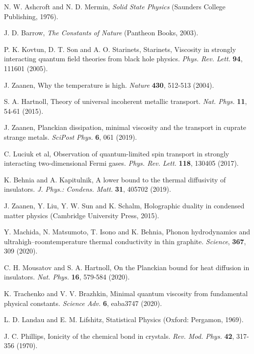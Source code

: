 \documentclass[aps,prl,groupedaddress,fleqn,twocolumn,10pt]{revtex4}
\begin{document}
\begin{thebibliography}{99}

 N. W. Ashcroft and N. D. Mermin, {\it Solid State Physics} (Saunders College Publishing, 1976).

 J. D. Barrow, {\it The Constants of Nature} (Pantheon Books, 2003).

 P. K. Kovtun, D. T. Son and A. O. Starinets, Starinets, Viscosity in strongly interacting quantum field
theories from black hole physics. {\it Phys. Rev. Lett.} {\bf 94}, 111601 (2005).

 J. Zaanen, Why the temperature is high. {\it Nature} {\bf 430}, 512-513 (2004).

 S. A. Hartnoll, Theory of universal incoherent metallic transport. {\it Nat. Phys.} {\bf 11}, 54-61 (2015).

 J. Zaanen, Planckian dissipation, minimal viscosity and the transport in cuprate strange
metals. {\it SciPost Phys.} {\bf 6}, 061 (2019).

 C. Luciuk et al, Observation of quantum-limited spin transport in strongly interacting two-dimensional
Fermi gases. {\it Phys. Rev. Lett.} {\bf 118}, 130405 (2017).

 K. Behnia and A. Kapitulnik, A lower bound to the thermal diffusivity
of insulators. {\it J. Phys.: Condens. Matt.} {\bf 31}, 405702 (2019).

 J. Zaanen, Y. Liu, Y. W. Sun and K. Schalm, Holographic duality in condensed matter physics (Cambridge University Press, 2015).

 Y. Machida, N. Matsumoto, T. Isono and K. Behnia, Phonon hydrodynamics and ultrahigh–roomtemperature
thermal conductivity in thin graphite. {\it Science}, {\bf 367}, 309 (2020).

 C. H. Mousatov and S. A. Hartnoll, On the Planckian bound for heat diffusion in insulators. {\it Nat. Phys.} {\bf 16}, 579-584 (2020).

 K. Trachenko and V. V. Brazhkin, Minimal quantum viscosity from fundamental physical constants. {\it Science Adv.} {\bf 6}, eaba3747 (2020).

 L. D. Landau and E. M. Lifshitz, Statistical Physics
(Oxford: Pergamon, 1969).

 J. C. Phillips, Ionicity of the chemical bond in crystals. {\it Rev. Mod. Phys.} {\bf 42}, 317-356 (1970).


\end{thebibliography}
\end{document}
